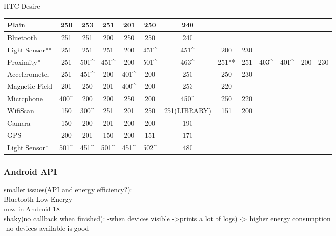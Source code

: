 	HTC Desire\\
	\begin{table}
    \begin{tabular}{| l | c | c | c | c | c | c | c | c | c | c | c | c |}
    \hline
    Plain          & 250  & 253  & 251  & 201  & 250  & 240          & ~     & ~   & ~    & ~    & ~   & ~   \\\hline
    Bluetooth      & 251  & 251  & 200  & 250  & 250  & 240          & ~     & ~   & ~    & ~    & ~   & ~   \\\hline
    Light Sensor** & 251  & 251  & 251  & 200  & 451\^ & 451\^        & 200   & 230 & ~    & ~    & ~   & ~   \\ \hline
    Proximity*     & 251  & 501\^ & 451\^ & 200  & 501\^ & 463\^        & 251** & 251 & 403\^ & 401\^ & 200 & 230 \\ \hline
    Accelerometer  & 251  & 451\^ & 200  & 401\^ & 200  & 250          & 250   & 230 & ~    & ~    & ~   & ~   \\ \hline
    Magnetic Field & 201  & 250  & 201  & 400\^ & 200  & 253          & 220   & ~   & ~    & ~    & ~   & ~   \\ \hline
    Microphone     & 400\^ & 200  & 200  & 250  & 200  & 450\^        & 250   & 220 & ~    & ~    & ~   & ~   \\ \hline
    WifiScan       & 150  & 300\^ & 251  & 201  & 250  & 251(LIBRARY) & 151   & 200 & ~    & ~    & ~   & ~   \\ \hline
    Camera         & 150  & 200  & 201  & 200  & 200  & 190          & ~     & ~   & ~    & ~    & ~   & ~   \\ \hline
    GPS            & 200  & 201  & 150  & 200  & 151  & 170          & ~     & ~   & ~    & ~    & ~   & ~   \\ \hline
    Light Sensor*  & 501\^ & 451\^ & 501\^ & 451\^ & 502\^ & 480          & ~     & ~   & ~    & ~    & ~   & ~   \\ \hline
    \end{tabular}
\end{table}

\subsubsection{Android API}
smaller issues(API and energy efficiency?):\\
	Bluetooth Low Energy\\
		new in Android 18\\
		shaky(no callback when finished):
			-when devices visible ->prints a lot of logs) -> higher energy consumption\\
			-no devices available is good
		
